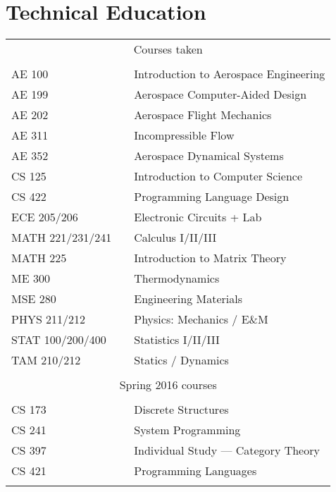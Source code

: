 \documentclass[10pt,letterpaper,sans]{moderncv}
\begin{document}
\section{Technical Education}
\vspace{1em}
\begin{tabular}{l p{1in} l}
  \multicolumn{3}{c}{Courses taken} \\
  \\[3pt]
  AE 100           & \hfill & Introduction to Aerospace Engineering \\
  AE 199           & \hfill & Aerospace Computer-Aided Design       \\
  AE 202           & \hfill & Aerospace Flight Mechanics            \\
  AE 311           & \hfill & Incompressible Flow                   \\
  AE 352           & \hfill & Aerospace Dynamical Systems           \\
  CS 125           & \hfill & Introduction to Computer Science      \\
  CS 422           & \hfill & Programming Language Design           \\
  ECE 205/206      & \hfill & Electronic Circuits + Lab             \\
  MATH 221/231/241 & \hfill & Calculus I/II/III                     \\
  MATH 225         & \hfill & Introduction to Matrix Theory         \\
  ME 300           & \hfill & Thermodynamics                        \\
  MSE 280          & \hfill & Engineering Materials                 \\
  PHYS 211/212     & \hfill & Physics: Mechanics / E\&M             \\
  STAT 100/200/400 & \hfill & Statistics I/II/III                   \\
  TAM 210/212      & \hfill & Statics / Dynamics                    \\
  \\
  \multicolumn{3}{c}{Spring 2016 courses} \\
  \\[3pt]
  CS 173           & \hfill & Discrete Structures                   \\
  CS 241           & \hfill & System Programming                    \\
  CS 397           & \hfill & Individual Study --- Category Theory  \\
  CS 421           & \hfill & Programming Languages                 \\
  \\
\end{tabular}
\end{document}
